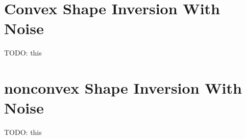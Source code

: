 \section{Convex Shape Inversion With Noise}

TODO: this

\section{nonconvex Shape Inversion With Noise}

TODO: this

